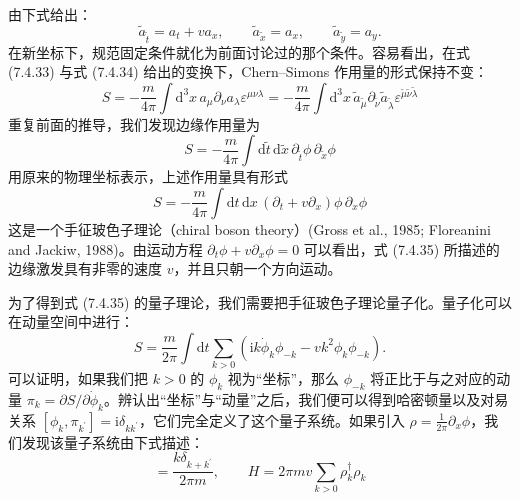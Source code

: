 由下式给出：
\begin{equation*}
\tilde{a}_{\tilde{t}}=a_{t}+va_{x},\qquad \tilde{a}_{\tilde{x}}=a_{x},\qquad \tilde{a}_{\tilde{y}}=a_{y}. \tag{7.4.34}
\end{equation*}
在新坐标下，规范固定条件就化为前面讨论过的那个条件。容易看出，在式 (7.4.33) 与式 (7.4.34) 给出的变换下，Chern--Simons 作用量的形式保持不变：
\begin{equation*}
S=-\frac{m}{4\pi}\int\mathrm{d}^{3}x\,a_{\mu}\partial_{\nu}a_{\lambda}\varepsilon^{\mu\nu\lambda}
=-\frac{m}{4\pi}\int\mathrm{d}^{3}x\,\tilde{a}_{\tilde{\mu}}\partial_{\tilde{\nu}}\tilde{a}_{\tilde{\lambda}}\varepsilon^{\tilde{\mu}\tilde{\nu}\tilde{\lambda}}
\end{equation*}
重复前面的推导，我们发现边缘作用量为
\begin{equation*}
S=-\frac{m}{4\pi}\int\mathrm{d}\tilde{t}\,\mathrm{d}\tilde{x}\,\partial_{\tilde{t}}\phi\,\partial_{\tilde{x}}\phi
\end{equation*}
用原来的物理坐标表示，上述作用量具有形式
\begin{equation*}
S=-\frac{m}{4\pi}\int\mathrm{d}t\,\mathrm{d}x\,(\partial_{t}+v\partial_{x})\phi\,\partial_{x}\phi \tag{7.4.35}
\end{equation*}
这是一个手征玻色子理论（chiral boson theory）(Gross et al., 1985; Floreanini and Jackiw, 1988)。由运动方程 $\partial_{t}\phi+v\partial_{x}\phi=0$ 可以看出，式 (7.4.35) 所描述的边缘激发具有非零的速度 $v$，并且只朝一个方向运动。

为了得到式 (7.4.35) 的量子理论，我们需要把手征玻色子理论量子化。量子化可以在动量空间中进行：
\begin{equation*}
S=\frac{m}{2\pi}\int\mathrm{d}t\sum_{k>0}\left(\mathrm{i}k\dot{\phi}_{k}\phi_{-k}-vk^{2}\phi_{k}\phi_{-k}\right).
\end{equation*}
可以证明，如果我们把 $k>0$ 的 $\phi_{k}$ 视为``坐标''，那么 $\phi_{-k}$ 将正比于与之对应的动量 $\pi_{k}=\partial S/\partial\dot{\phi}_{k}$。辨认出``坐标''与``动量''之后，我们便可以得到哈密顿量以及对易关系 $[\phi_{k},\pi_{k^{\prime}}]=\mathrm{i}\delta_{kk^{\prime}}$，它们完全定义了这个量子系统。如果引入 $\rho=\frac{1}{2\pi}\partial_{x}\phi$，我们发现该量子系统由下式描述：
\begin{equation*}
[\rho_{k},\rho_{k^{\prime}}]=\frac{k\delta_{k+k^{\prime}}}{2\pi m},\qquad
H=2\pi mv\sum_{k>0}\rho_{k}^{\dagger}\rho_{k} \tag{7.4.36}
\end{equation*}


